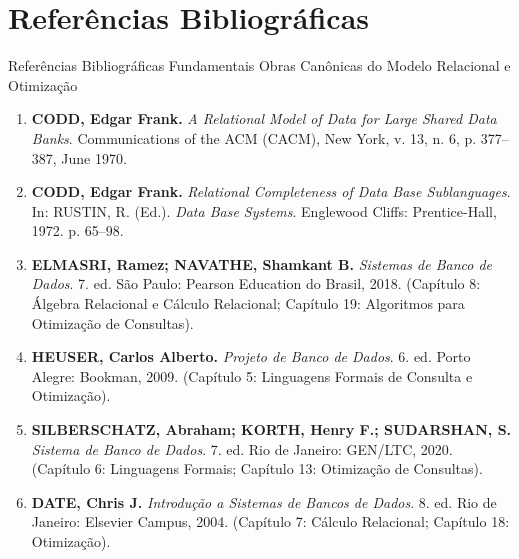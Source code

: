 \section[Referências]{Referências Bibliográficas}

\begin{frame}{Referências Bibliográficas Fundamentais}
  \alert{Obras Canônicas do Modelo Relacional e Otimização}\par
  \vspace{0.3cm}
  \scriptsize
  \begin{enumerate}
    \item \textbf{CODD, Edgar Frank.} \emph{A Relational Model of Data for Large Shared Data Banks}. Communications of the ACM (CACM), New York, v. 13, n. 6, p. 377–387, June 1970.
    \item \textbf{CODD, Edgar Frank.} \emph{Relational Completeness of Data Base Sublanguages}. In: RUSTIN, R. (Ed.). \emph{Data Base Systems}. Englewood Cliffs: Prentice-Hall, 1972. p. 65–98.
    \item \textbf{ELMASRI, Ramez; NAVATHE, Shamkant B.} \emph{Sistemas de Banco de Dados}. 7. ed. São Paulo: Pearson Education do Brasil, 2018. (Capítulo 8: Álgebra Relacional e Cálculo Relacional; Capítulo 19: Algoritmos para Otimização de Consultas).
    \item \textbf{HEUSER, Carlos Alberto.} \emph{Projeto de Banco de Dados}. 6. ed. Porto Alegre: Bookman, 2009. (Capítulo 5: Linguagens Formais de Consulta e Otimização).
    \item \textbf{SILBERSCHATZ, Abraham; KORTH, Henry F.; SUDARSHAN, S.} \emph{Sistema de Banco de Dados}. 7. ed. Rio de Janeiro: GEN/LTC, 2020. (Capítulo 6: Linguagens Formais; Capítulo 13: Otimização de Consultas).
    \item \textbf{DATE, Chris J.} \emph{Introdução a Sistemas de Bancos de Dados}. 8. ed. Rio de Janeiro: Elsevier Campus, 2004. (Capítulo 7: Cálculo Relacional; Capítulo 18: Otimização).
  \end{enumerate}
\end{frame}

